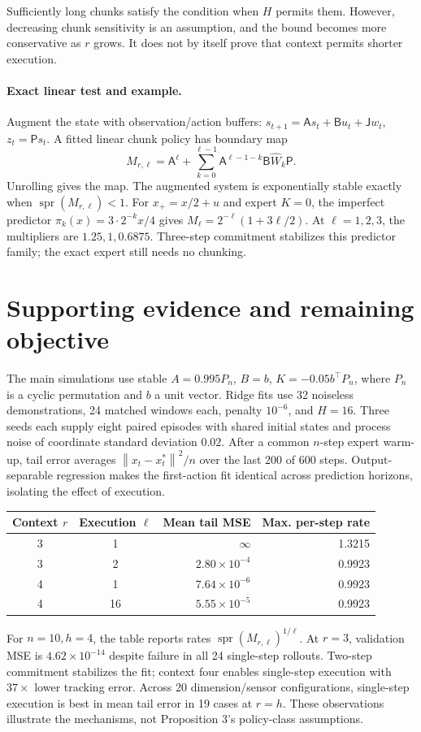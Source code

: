 \documentclass{l4dc2026}
\newcommand{\norm}[1]{\left\lVert#1\right\rVert}
\newcommand{\spr}{\operatorname{spr}}
\begin{document}
Sufficiently long chunks satisfy the condition when $H$ permits them. However, decreasing chunk sensitivity is an assumption, and the bound becomes more conservative as $r$ grows. It does not by itself prove that context permits shorter execution.

\paragraph{Exact linear test and example.}
Augment the state with observation/action buffers: $s_{t+1}=\mathsf As_t+\mathsf Bu_t+\mathsf Jw_t$, $z_t=\mathsf Ps_t$. A fitted linear chunk policy has boundary map
\begin{equation}
M_{r,\ell}=\mathsf A^\ell+\sum_{k=0}^{\ell-1}\mathsf A^{\ell-1-k}\mathsf B\widehat W_k\mathsf P.
\label{eq:lift}
\end{equation}
Unrolling gives the map. The augmented system is exponentially stable exactly when $\spr(M_{r,\ell})<1$. For $x_+=x/2+u$ and expert $K=0$, the imperfect predictor $\pi_k(x)=3\cdot2^{-k}x/4$ gives $M_\ell=2^{-\ell}(1+3\ell/2)$. At $\ell=1,2,3$, the multipliers are $1.25,1,0.6875$. Three-step commitment stabilizes this predictor family; the exact expert still needs no chunking.

\clearpage
\section{Supporting evidence and remaining objective}
The main simulations use stable $A=0.995P_n$, $B=b$, $K=-0.05b^\top P_n$, where $P_n$ is a cyclic permutation and $b$ a unit vector. Ridge fits use 32 noiseless demonstrations, 24 matched windows each, penalty $10^{-6}$, and $H=16$. Three seeds each supply eight paired episodes with shared initial states and process noise of coordinate standard deviation $0.02$. After a common $n$-step expert warm-up, tail error averages $\norm{x_t-x_t^*}^2/n$ over the last 200 of 600 steps. Output-separable regression makes the first-action fit identical across prediction horizons, isolating the effect of execution.

\begin{center}\small
\begin{tabular}{ccrr}\toprule
Context $r$ & Execution $\ell$ & Mean tail MSE & Max. per-step rate\\\midrule
3&1&$\infty$&1.3215\\
3&2&$2.80\times10^{-4}$&0.9923\\
4&1&$7.64\times10^{-6}$&0.9923\\
4&16&$5.55\times10^{-5}$&0.9923\\\bottomrule
\end{tabular}
\end{center}
For $n=10,h=4$, the table reports rates $\spr(M_{r,\ell})^{1/\ell}$. At $r=3$, validation MSE is $4.62\times10^{-14}$ despite failure in all 24 single-step rollouts. Two-step commitment stabilizes the fit; context four enables single-step execution with $37\times$ lower tracking error. Across 20 dimension/sensor configurations, single-step execution is best in mean tail error in 19 cases at $r=h$. These observations illustrate the mechanisms, not Proposition 3's policy-class assumptions.
\end{document}

